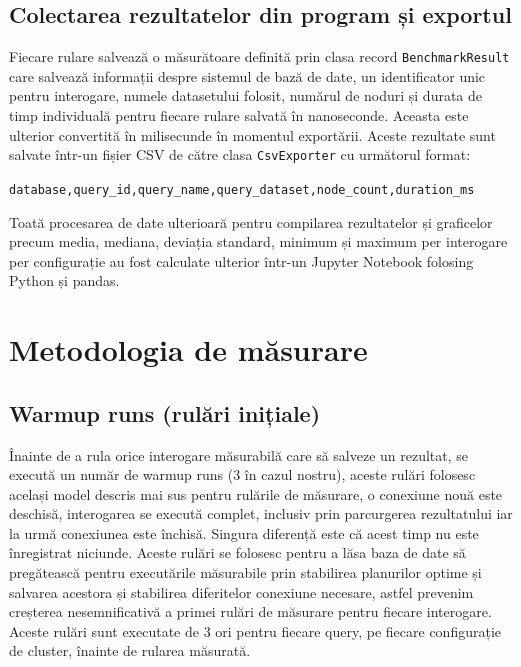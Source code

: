 \subsection{Colectarea rezultatelor din program și exportul}

Fiecare rulare salvează o măsurătoare definită prin clasa record \texttt{BenchmarkResult} care salvează informații despre sistemul de bază de date, un identificator unic pentru interogare, numele datasetului folosit, numărul de noduri și durata de timp individuală pentru fiecare rulare salvată în nanoseconde. Aceasta este ulterior convertită în milisecunde în momentul exportării. Aceste rezultate sunt salvate într-un fișier CSV de către clasa \texttt{CsvExporter} cu următorul format:
\begin{center}
    \texttt{database,query\_id,query\_name,query\_dataset,node\_count,duration\_ms}
\end{center}

Toată procesarea de date ulterioară pentru compilarea rezultatelor și graficelor precum media, mediana, deviația standard, minimum și maximum per interogare per configurație au fost calculate ulterior într-un Jupyter Notebook folosing Python și pandas.

\section{Metodologia de măsurare}

\subsection{Warmup runs (rulări inițiale)}

Înainte de a rula orice interogare măsurabilă care să salveze un rezultat, se execută un număr de warmup runs (3 în cazul nostru), aceste rulări folosesc același model descris mai sus pentru rulările de măsurare, o conexiune nouă este deschisă, interogarea se execută complet, inclusiv prin parcurgerea rezultatului iar la urmă conexiunea este închisă. Singura diferență este că acest timp nu este înregistrat niciunde. Aceste rulări se folosesc pentru a lăsa baza de date să pregătească pentru executările măsurabile prin stabilirea planurilor optime și salvarea acestora și stabilirea diferitelor conexiune necesare, astfel prevenim creșterea nesemnificativă a primei rulări de măsurare pentru fiecare interogare. Aceste rulări sunt executate de 3 ori pentru fiecare query, pe fiecare configurație de cluster, înainte de rularea măsurată.

